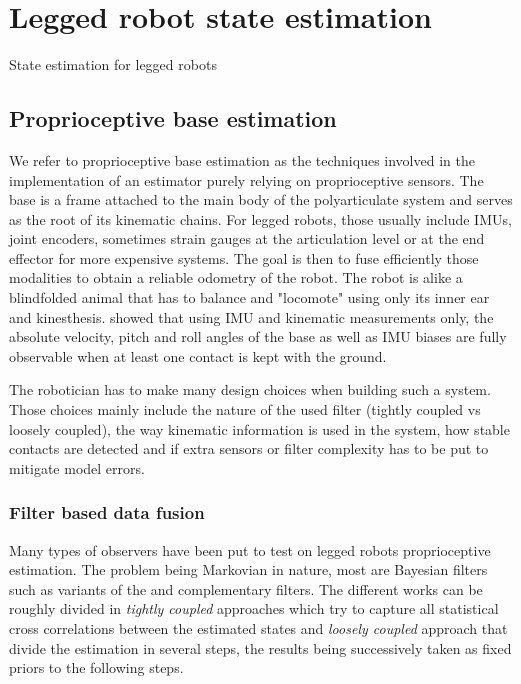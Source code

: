 \chapter{Legged robot state estimation}
State estimation for legged robots 


\section{Proprioceptive base estimation}
 We refer to proprioceptive base estimation as the techniques involved in the implementation of an estimator purely relying
 on proprioceptive sensors. The base is a frame attached to the main body of the polyarticulate system and serves
 as the root of its kinematic chains. For legged robots, those usually include IMUs, joint encoders, sometimes strain gauges at the 
 articulation level or at the end effector for more expensive systems. The goal is then to fuse efficiently those 
 modalities to obtain a reliable odometry of the robot. The robot is alike a blindfolded animal that has to balance and "locomote" using 
 only its inner ear and kinesthesis. \cite{bloesch2013state,rotella2014state} showed that using IMU and kinematic measurements 
 only, the absolute velocity, pitch and roll angles of the base as well as IMU biases are fully observable when at least one contact 
 is kept with the ground.

 The robotician has to make many design choices when building such a system. Those choices mainly include the nature of the used filter (tightly coupled vs loosely coupled), 
 the way kinematic information is used in the system, how stable contacts are detected and if extra sensors or filter complexity
 has to be put to mitigate model errors.
 

\subsection{Filter based data fusion}
Many types of observers have been put to test on legged robots proprioceptive estimation. The problem being Markovian in nature,
most are Bayesian filters such as variants of the \KalmanF \cite{kalman1960new} and complementary filters. The different works can be 
roughly divided in \textit{tightly coupled} approaches which try to capture all statistical cross correlations between the estimated states
and \textit{loosely coupled} approach that divide the estimation in several steps, the results being successively taken as fixed priors to the 
following steps.







